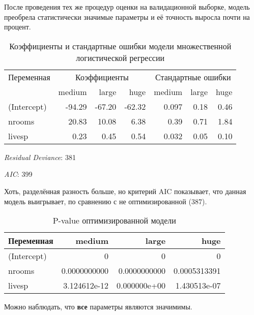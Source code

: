 После проведения тех же процедур оценки на валидационной выборке, модель преобрела статистически значимые параметры и её точность выросла почти на процент. 
\begin{table}[h]
	\centering
	\caption{Коэффициенты и стандартные ошибки модели множественной логистической регрессии}
	\begin{tabular}{@{}l|rrr|rrr@{}}
		\toprule
		Переменная & \multicolumn{3}{c|}{Коэффициенты} & \multicolumn{3}{c}{Стандартные ошибки} \\ \cmidrule{2-4} \cmidrule{5-7}
		& medium & large & huge & medium & large & huge \\ \midrule
		(Intercept) & -94.29 & -67.20 & -62.32 & 0.097 & 0.18 & 0.46 \\
		nrooms      & 20.83 & 10.08 & 6.38  & 0.39  & 0.71  & 1.84  \\
		livesp      & 0.23 & 0.45 & 0.54 & 0.032 & 0.05 & 0.10 \\ \bottomrule
	\end{tabular}
\end{table}

\textit{Residual Deviance}: 381

\textit{AIC}: 399

Хоть, разделённая разность больше, но критерий AIC показывает, что данная модель выигрывает, по сравнению с не оптимизированной (387).





\begin{table}[h]
	\centering
	\caption{P-value оптимизированной модели}
	\begin{tabular}{@{}l|rrr@{}}
		\toprule
		Переменная & medium & large & huge \\ \midrule
		(Intercept) & 0 & 0 & 0 \\
		nrooms      & 0.0000000000 & 0.0000000000 & 0.0005313391 \\
		livesp      & 3.124612e-12 & 0.000000e+00 & 1.430513e-07 \\ \bottomrule
	\end{tabular}
\end{table}
Можно наблюдать, что \textbf{все} параметры являются значимимы.

